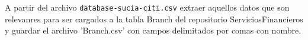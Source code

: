 A partir del archivo \texttt{database-sucia-citi.csv} extraer 
aquellos datos que son relevanres para ser cargados a la tabla 
Branch del repositorio ServiciosFinancieros y guardar el archivo 
'Branch.csv' con campos delimitados por comas con nombre.

